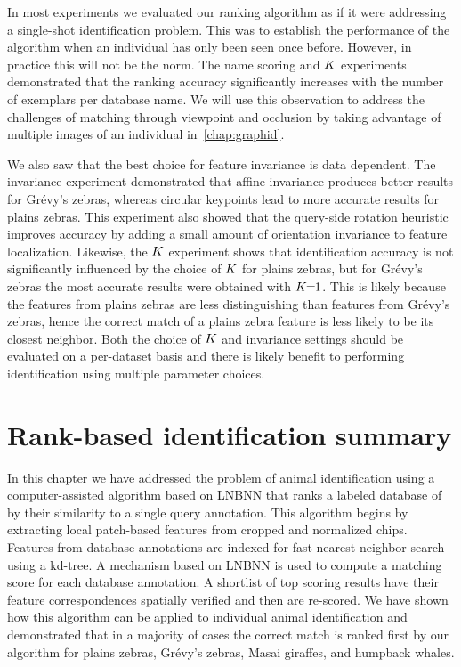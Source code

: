         In most experiments we evaluated our ranking algorithm as if it were addressing a single-shot
        identification problem. This was to establish the performance of the algorithm when an individual has only
        been seen once before. However, in practice this will not be the norm. The name scoring and $K$
        experiments demonstrated that the ranking accuracy significantly increases with the number of exemplars per
        database name. We will use this observation to address the challenges of matching through viewpoint and
        occlusion by taking advantage of multiple images of an individual in~\cref{chap:graphid}.

        We also saw that the best choice for feature invariance is data dependent. The invariance experiment
        demonstrated that affine invariance produces better results for Grévy's zebras, whereas circular keypoints
        lead to more accurate results for plains zebras. This experiment also showed that the query-side rotation
        heuristic improves accuracy by adding a small amount of orientation invariance to feature localization.
        Likewise, the $K$ experiment shows that identification accuracy is not significantly influenced by the
        choice of $K$ for plains zebras, but for Grévy's zebras the most accurate results were obtained with
        $K\mkern-6mu=\mkern-6mu1$. This is likely because the features from plains zebras are less distinguishing than features
        from Grévy's zebras, hence the correct match of a plains zebra feature is less likely to be its closest
        neighbor. Both the choice of $K$ and invariance settings should be evaluated on a per-dataset basis and
        there is likely benefit to performing identification using multiple parameter choices.


\section{Rank-based identification summary}\label{sec:staticsum}

    In this chapter we have addressed the problem of animal identification using a computer-assisted algorithm
    based on LNBNN that ranks a labeled database of \names{} by their similarity to a single query annotation. This
    algorithm begins by extracting local patch-based features from cropped and normalized chips. Features from
    database annotations are indexed for fast nearest neighbor search using a kd-tree. A mechanism based on LNBNN
    is used to compute a matching score for each database annotation. A shortlist of top scoring results have their
    feature correspondences spatially verified and then are re-scored. We have shown how this algorithm can be
    applied to individual animal identification and demonstrated that in a majority of cases the correct match is
    ranked first by our algorithm for plains zebras, Grévy's zebras, Masai giraffes, and humpback whales.


